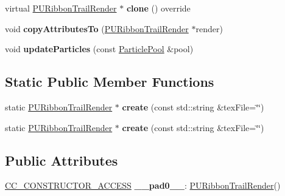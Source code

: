 \begin{DoxyCompactItemize}
virtual \hyperlink{classPURibbonTrailRender}{P\+U\+Ribbon\+Trail\+Render} $\ast$ {\bfseries clone} () override
\item 
\mbox{\label{classPURibbonTrailRender_a0d6006a6db08f35129eec25fefe9e0b0}} 
void {\bfseries copy\+Attributes\+To} (\hyperlink{classPURibbonTrailRender}{P\+U\+Ribbon\+Trail\+Render} $\ast$render)
\item 
\mbox{\label{classPURibbonTrailRender_a0e4a6bc5ce65e6613942b96b3fadb39d}} 
void {\bfseries update\+Particles} (const \hyperlink{classDataPool}{Particle\+Pool} \&pool)
\end{DoxyCompactItemize}
\subsection*{Static Public Member Functions}
\begin{DoxyCompactItemize}
\item 
\mbox{\label{classPURibbonTrailRender_a1dbce68b44179a8724aa6b4e4e51fd87}} 
static \hyperlink{classPURibbonTrailRender}{P\+U\+Ribbon\+Trail\+Render} $\ast$ {\bfseries create} (const std\+::string \&tex\+File=\char`\"{}\char`\"{})
\item 
\mbox{\label{classPURibbonTrailRender_a3c2affba84d0c81261b49de4a152b53c}} 
static \hyperlink{classPURibbonTrailRender}{P\+U\+Ribbon\+Trail\+Render} $\ast$ {\bfseries create} (const std\+::string \&tex\+File=\char`\"{}\char`\"{})
\end{DoxyCompactItemize}
\subsection*{Public Attributes}
\begin{DoxyCompactItemize}
\item 
\mbox{\label{classPURibbonTrailRender_acc29b90d1b16945148a159fddaae6548}} 
\hyperlink{_2cocos2d_2cocos_2base_2ccConfig_8h_a25ef1314f97c35a2ed3d029b0ead6da0}{C\+C\+\_\+\+C\+O\+N\+S\+T\+R\+U\+C\+T\+O\+R\+\_\+\+A\+C\+C\+E\+SS} {\bfseries \+\_\+\+\_\+pad0\+\_\+\+\_\+}\+: \hyperlink{classPURibbonTrailRender}{P\+U\+Ribbon\+Trail\+Render}()
\end{DoxyCompactItemize}
